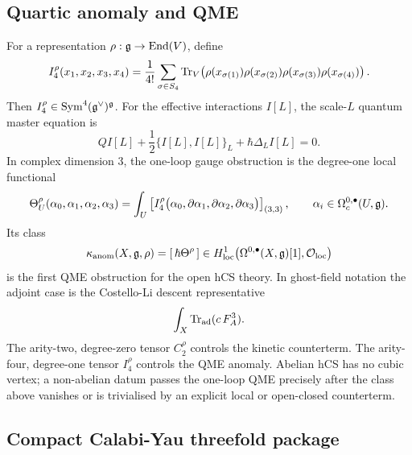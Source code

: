 \subsection{Quartic anomaly and QME}

For a representation \(\rho:\mathfrak{g}\to\operatorname{End}(V)\), define
\[
  I_4^{\rho}(x_1,x_2,x_3,x_4)
  =
  \frac1{4!}\sum_{\sigma\in S_4}
  \operatorname{Tr}_V\!\left(
    \rho(x_{\sigma(1)})\rho(x_{\sigma(2)})
    \rho(x_{\sigma(3)})\rho(x_{\sigma(4)})
  \right).
\]
Then \(I_4^{\rho}\in\mathrm{Sym}^4(\mathfrak{g}^{\vee})^{\mathfrak{g}}\).  For the effective
interactions \(I[L]\), the scale-\(L\) quantum master equation is
\[
  QI[L]+\frac12\{I[L],I[L]\}_{L}
  +\hbar\Delta_LI[L]=0 .
\]
In complex dimension \(3\), the one-loop gauge obstruction is the
degree-one local functional
\[
  \Theta^{\rho}_U(\alpha_0,\alpha_1,\alpha_2,\alpha_3)
  =
  \int_U
  \left[
  I_4^{\rho}\bigl(
    \alpha_0,\partial\alpha_1,\partial\alpha_2,\partial\alpha_3
  \bigr)
  \right]_{(3,3)},
  \qquad
  \alpha_i\in\Omega_c^{0,\bullet}(U,\mathfrak{g}).
\]
Its class
\[
  \kappa_{\mathrm{anom}}(X,\mathfrak{g},\rho)
  =
  [\,\hbar\Theta^{\rho}\,]
  \in
  H^1_{\mathrm{loc}}
  \bigl(\Omega^{0,\bullet}(X,\mathfrak{g})[1],\mathcal{O}_{\mathrm{loc}}\bigr)
\]
is the first QME obstruction for the open hCS theory.  In ghost-field
notation the adjoint case is the Costello-Li descent representative
\[
  \int_X \operatorname{Tr}_{\mathrm{ad}}(c\,F_A^3).
\]
The arity-two, degree-zero tensor \(C_2^{\rho}\) controls the kinetic
counterterm.  The arity-four, degree-one tensor \(I_4^{\rho}\) controls
the QME anomaly.  Abelian hCS has no cubic vertex; a non-abelian datum
passes the one-loop QME precisely after the class above vanishes or is
trivialised by an explicit local or open-closed counterterm.

\subsection{Compact Calabi-Yau threefold package}

